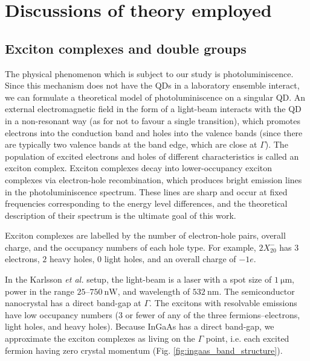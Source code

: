 \section{Discussions of theory employed}

\subsection[Exciton complexes]{Exciton complexes and double groups} \label{sec:exciton_theory}
The physical phenomenon which is subject to our study is photoluminiscence. Since this mechanism does not have the QDs in a laboratory ensemble interact, we can formulate a theoretical model of photoluminiscence on a singular QD. An external electromagnetic field in the form of a light-beam interacts with the QD in a non-resonant way (as for not to favour a single transition), which promotes electrons into the conduction band and holes into the valence bands (since there are typically two valence bands at the band edge, which are close at $\Gamma$). The population of excited electrons and holes of different characteristics is called an exciton complex. Exciton complexes decay into lower-occupancy exciton complexes via electron-hole recombination, which produces bright emission lines in the photoluminiscence spectrum. These lines are sharp and occur at fixed frequencies corresponding to the energy level differences, and the theoretical description of their spectrum is the ultimate goal of this work.

Exciton complexes are labelled by the number of electron-hole pairs, overall charge, and the occupancy numbers of each hole type. For example, $2X^-_{20}$ has $3$ electrons, $2$ heavy holes, $0$ light holes, and an overall charge of $-1e$.

In the Karlsson \textit{et al.} setup, the light-beam is a laser with a spot size of $\SI{1}{\micro\metre}$, power in the range $25$--$\SI{750}{\nano\watt}$, and wavelength of $\SI{532}{\nano\metre}$. The semiconductor nanocrystal has a direct band-gap at $\Gamma$. The excitons with resolvable emissions have low occupancy numbers (3 or fewer of any of the three fermions--electrons, light holes, and heavy holes). Because InGaAs has a direct band-gap, we approximate the exciton complexes as living on the $\Gamma$ point, i.e. each excited fermion having zero crystal momentum (Fig. \ref{fig:ingaas_band_structure}).

